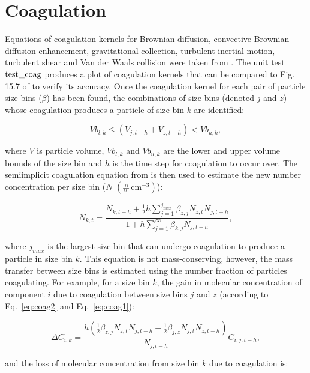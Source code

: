 \documentclass[gmd, manuscript]{copernicus}
\begin{document}
\section{Coagulation}\label{sec:coag}

Equations of coagulation kernels for Brownian diffusion, convective Brownian diffusion enhancement, gravitational collection, turbulent inertial motion, turbulent shear and Van der Waals collision were taken from \citet{Jacobson2005}.  The unit test $\rm{test\_coag}$ produces a plot of coagulation kernels that can be compared to Fig. 15.7 of \citet{Jacobson2005} to verify its accuracy.  Once the coagulation kernel for each pair of particle size bins ($\beta$) has been found, the combinations of size bins (denoted $j$ and $z$) whose coagulation produces a particle of size bin $k$ are identified:

 \begin{equation} \label{eq:coag2}
Vb_{l,k} \leq (V_{j,t-h}+V_{z,t-h}) < Vb_{u,k},
\end{equation}

where $V$ is particle volume, $Vb_{l,k}$ and $Vb_{u,k}$ are the lower and upper volume bounds of the size bin and $h$ is the time step for coagulation to occur over.  The semiimplicit coagulation equation from \citet{Jacobson2005} is then used to estimate the new number concentration per size bin ($N$ $(\#\, \mathrm{cm^{-3}})$):

\begin{equation} \label{eq:coag1}
N_{k,t} = \frac{N_{k,t-h}+\frac{1}{2}h\sum_{j=1}^{j_{max}}\beta_{z,j}N_{z,t}N_{j,t-h}}{1+h\sum_{j=1}^{\infty}\beta_{k,j}N_{j,t-h}},
\end{equation}

where $j_{max}$ is the largest size bin that can undergo coagulation to produce a particle in size bin $k$.  This equation is not mass-conserving, however, the mass transfer between size bins is estimated using the number fraction of particles coagulating.  For example, for a size bin $k$, the gain in molecular concentration of component $i$ due to coagulation between size bins $j$ and $z$ (according to Eq.~\ref{eq:coag2} and Eq.~\ref{eq:coag1}):

\begin{equation} \label{eq:coag3}
\Delta C_{i,k} = \frac{h(\frac{1}{2}\beta_{z,j}N_{z,t}N_{j,t-h}+\frac{1}{2}\beta_{j,z}N_{j,t}N_{z,t-h})}{N_{j,t-h}}C_{i,j,t-h},
\end{equation}

and the loss of molecular concentration from size bin $k$ due to coagulation is:
\end{document}
